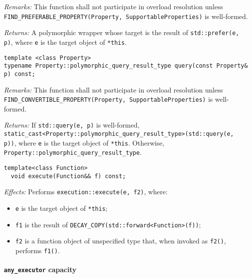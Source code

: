 \documentclass[a4paper,12pt,notitlepage,twoside,openright]{article}
\begin{document}
\emph{Remarks:} This function shall not participate in overload
resolution unless
\texttt{FIND_PREFERABLE_PROPERTY(Property, SupportableProperties)}
is well-formed.

\emph{Returns:} A polymorphic wrapper whose target is the result of
\texttt{std::prefer(e, p)}, where \texttt{e} is
the target object of \texttt{*this}.

\begin{verbatim}
template <class Property>
typename Property::polymorphic_query_result_type query(const Property& p) const;
\end{verbatim}

\emph{Remarks:} This function shall not participate in overload
resolution unless
\texttt{FIND_CONVERTIBLE_PROPERTY(Property, SupportableProperties)}
is well-formed.

\emph{Returns:} If \texttt{std::query(e, p)} is well-formed,
\texttt{static_cast<Property::polymorphic_query_result_type>(std::query(e, p))},
where \texttt{e} is the target object of
\texttt{*this}. Otherwise,
\texttt{Property::polymorphic_query_result_type{}}.

\begin{verbatim}
template<class Function>
  void execute(Function&& f) const;
\end{verbatim}

\emph{Effects:} Performs \texttt{execution::execute(e, f2)},
where:

\begin{itemize}

\item
  \texttt{e} is the target object of
  \texttt{*this};
\item
  \texttt{f1} is the result of
  \texttt{DECAY_COPY(std::forward<Function>(f))};
\item
  \texttt{f2} is a function object of unspecified type that,
  when invoked as \texttt{f2()}, performs
  \texttt{f1()}.
\end{itemize}

\hypertarget{any_executor-capacity}{%
\paragraph{\texorpdfstring{\texttt{any_executor}
capacity}{ capacity}}\label{any_executor-capacity}}
\end{document}
